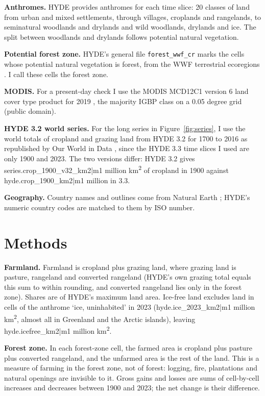 \documentclass[11pt,a4paper]{article}
\begin{document}
\textbf{Anthromes.} HYDE provides anthromes \citep{ellis2010,ellis2021} for each time slice: 20 classes of land from urban and mixed settlements, through villages, croplands and rangelands, to seminatural woodlands and drylands and wild woodlands, drylands and ice. The split between woodlands and drylands follows potential natural vegetation.

\textbf{Potential forest zone.} HYDE's general file \texttt{forest\_wwf\_cr} marks the cells whose potential natural vegetation is forest, from the WWF terrestrial ecoregions \citep{olson}. I call these cells the forest zone.

\textbf{MODIS.} For a present-day check I use the MODIS MCD12C1 version 6 land cover type product for 2019 \citep{modis}, the majority IGBP class on a 0.05 degree grid (public domain).

\textbf{HYDE 3.2 world series.} For the long series in Figure~\ref{fig:series}, I use the world totals of cropland and grazing land from HYDE 3.2 for 1700 to 2016 as republished by Our World in Data \citep{owid}, since the HYDE 3.3 time slices I used are only 1900 and 2023. The two versions differ: HYDE 3.2 gives {{series.crop_1900_v32_km2|m1}} million km\textsuperscript{2} of cropland in 1900 against {{hyde.crop_1900_km2|m1}} million in 3.3.

\textbf{Geography.} Country names and outlines come from Natural Earth \citep{naturalearth}; HYDE's numeric country codes are matched to them by ISO number.

\section{Methods}
\textbf{Farmland.} Farmland is cropland plus grazing land, where grazing land is pasture, rangeland and converted rangeland (HYDE's own grazing total equals this sum to within rounding, and converted rangeland lies only in the forest zone). Shares are of HYDE's maximum land area. Ice-free land excludes land in cells of the anthrome `ice, uninhabited' in 2023 ({{hyde.ice_2023_km2|m1}} million km\textsuperscript{2}, almost all in Greenland and the Arctic islands), leaving {{hyde.icefree_km2|m1}} million km\textsuperscript{2}.

\textbf{Forest zone.} In each forest-zone cell, the farmed area is cropland plus pasture plus converted rangeland, and the unfarmed area is the rest of the land. This is a measure of farming in the forest zone, not of forest: logging, fire, plantations and natural openings are invisible to it. Gross gains and losses are sums of cell-by-cell increases and decreases between 1900 and 2023; the net change is their difference.
\end{document}
